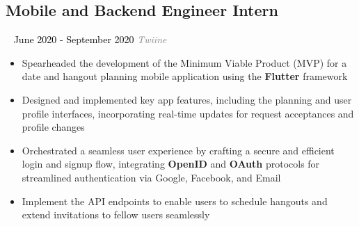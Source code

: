 \documentclass{article}
\newcommand{\resumesection}[3]{
    \subsection*{#1}
    \ 
    \normalsize
    \normalsize
    \hfill
    \textcolor{black}{#3}
    \normalsize
    \newline
    \small
    \textcolor{grey}{\emph{#2}}
}
\begin{document}
\resumesection{Mobile and Backend Engineer Intern}{Twiine}{June 2020 - September 2020}
\begin{itemize}
    \item Spearheaded the development of the Minimum Viable Product (MVP) for a date and hangout planning mobile application using the \textbf{Flutter} framework
    \item Designed and implemented key app features, including the planning and user profile interfaces, incorporating real-time updates for request acceptances and profile changes
    \item Orchestrated a seamless user experience by crafting a secure and efficient login and signup flow, integrating \textbf{OpenID} and \textbf{OAuth} protocols for streamlined authentication via Google, Facebook, and Email
    \item Implement the API endpoints to enable users to schedule hangouts and extend invitations to fellow users seamlessly
\end{itemize}
\end{document}
